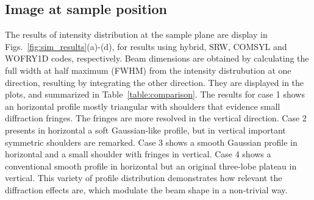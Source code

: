 \documentclass{iucr}              %
\newcommand{\inred}[1]{{\color{red}#1}}
\begin{document}
\newpage




\subsection{Image at sample position}

The results of intensity distribution at the sample plane are display in Figs.~\ref{fig:sim_results}(a)-(d), for results using hybrid, SRW, COMSYL and WOFRY1D codes, respectively.  Beam dimensions are obtained by calculating the full width at half maximum (FWHM) from the intensity distrubution at one direction, resulting by integrating the other direction. They are displayed in the plots, and summarized in Table~\ref{table:comparison}.
The results for case 1 shows an horizontal profile mostly triangular with shoulders that evidence small diffraction fringes. The fringes are more resolved in the vertical direction. Case 2  presents in horizontal a soft Gaussian-like profile, but in vertical important symmetric shoulders are remarked. Case 3 shows a smooth Gaussian profile in horizontal and a small shoulder with fringes in vertical. Case 4 shows a conventional smooth profile in horizontal but an original three-lobe plateau in vertical. This variety of profile distribution demonstrates how relevant the diffraction effects are, which modulate the beam shape in a non-trivial way.  

\newpage
\onecolumn
\end{document}
